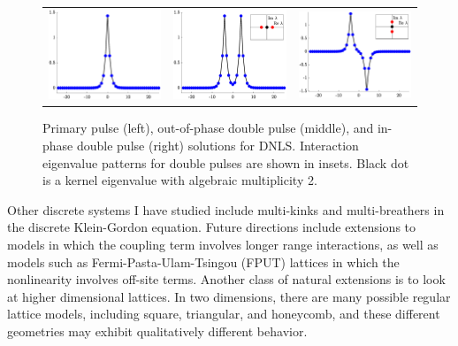 \begin{figure}
    \centering
    \begin{tabular}{ccc}
        \includegraphics[width=5cm]{images/DNLSprimary.eps} &
        \includegraphics[width=5cm]{images/DNLSunstable2p.eps} &
        \includegraphics[width=5cm]{images/DNLSstable2p.eps} 
    \end{tabular}
    \caption{Primary pulse (left), out-of-phase double pulse (middle), and in-phase double pulse (right) solutions for DNLS. Interaction eigenvalue patterns for double pulses are shown in insets. Black dot is a kernel eigenvalue with algebraic multiplicity 2.}
    \label{fig:DNLS2p}
\end{figure}

Other discrete systems I have studied include multi-kinks \cite{ParkerSG} and multi-breathers \cite{Parker2022DKGbreathers} in the discrete Klein-Gordon equation. 
Future directions include extensions to models in which the coupling term involves longer range interactions, as well as models such as Fermi-Pasta-Ulam-Tsingou (FPUT) lattices in which the nonlinearity involves off-site terms. Another class of natural extensions is to look at higher dimensional lattices. In two dimensions, there are many possible regular lattice models, including square, triangular, and honeycomb, and these different geometries may exhibit qualitatively different behavior. 